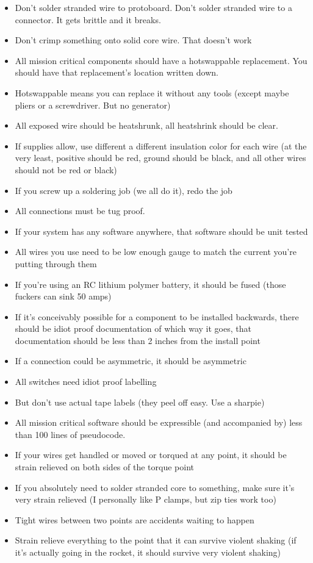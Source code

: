 \begin{itemize}

\item Don't solder stranded wire to protoboard. Don't solder stranded wire to a connector. It gets brittle and it breaks.
\item Don't crimp something onto solid core wire. That doesn't work
\item All mission critical components should have a hotswappable replacement. You should have that replacement's location written down.
\item Hotswappable means you can replace it without any tools (except maybe pliers or a screwdriver. But no generator)
\item All exposed wire should be heatshrunk, all heatshrink should be clear.
\item If supplies allow, use different a different insulation color for each wire (at the very least, positive should be red, ground should be black, and all other wires should not be red or black)
\item If you screw up a soldering job (we all do it), redo the job
\item All connections must be tug proof.
\item If your system has any software anywhere, that software should be unit tested
\item All wires you use need to be low enough gauge to match the current you're putting through them
\item If you're using an RC lithium polymer battery, it should be fused (those fuckers can sink 50 amps)
\item If it's conceivably possible for a component to be installed backwards, there should be idiot proof documentation of which way it goes, that documentation should be less than 2 inches from the install point
\item If a connection could be asymmetric, it should be asymmetric
\item All switches need idiot proof labelling
\item But don't use actual tape labels (they peel off easy. Use a sharpie)
\item All mission critical software should be expressible (and accompanied by) less than 100 lines of pseudocode.
\item If your wires get handled or moved or torqued at any point, it should be strain relieved on both sides of the torque point
\item If you absolutely need to solder stranded core to something, make sure it's very strain relieved (I personally like P clamps, but zip ties work too)
\item Tight wires between two points are accidents waiting to happen
\item Strain relieve everything to the point that it can survive violent shaking (if it's actually going in the rocket, it should survive very violent shaking)
\end{itemize}

